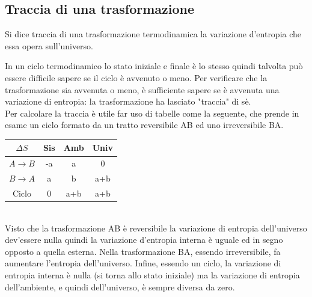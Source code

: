 \documentclass[
10pt, %
a4paper, %
oneside, %
headinclude,footinclude, %
BCOR5mm, %
]{scrartcl}
\begin{document}
\subsection{Traccia di una trasformazione}
\begin{definition}
	Si dice traccia di una trasformazione termodinamica la variazione d'entropia che essa opera sull'universo.
\end{definition}
In un ciclo termodinamico lo stato iniziale e finale è lo stesso quindi talvolta può essere difficile sapere se il ciclo è avvenuto o meno. Per verificare che la trasformazione sia avvenuta o meno, è sufficiente sapere se è avvenuta una variazione di entropia: la trasformazione ha lasciato "traccia" di sè.\\
Per calcolare la traccia è utile far uso di tabelle come la seguente, che prende in esame un ciclo formato da un tratto reversibile AB ed uno irreversibile BA. 
\begin{table}[h!]
	\begin{center}
		\begin{tabular}{ || c| c | c| c|| }
			\hline
			\(\Delta S\) & Sis& Amb& Univ\\
			\hline
			\(A\rightarrow B\)& -a   &a  &0  \\
			\(B\rightarrow A\)& a    &b   &a+b\\
			\hline
			Ciclo         & 0    &a+b &a+b \\
			\hline
		\end{tabular}
	\end{center}
\end{table}\\
Visto che la trasformazione AB è reversibile la variazione di entropia dell'universo dev'essere nulla quindi la variazione d'entropia interna è uguale ed in segno opposto a quella esterna. Nella trasformazione BA, essendo irreversibile, fa aumentare l'entropia dell'universo. Infine, essendo un ciclo, la variazione di entropia interna è nulla (si torna allo stato iniziale) ma la variazione di entropia dell'ambiente, e quindi dell'universo, è sempre diversa da zero. 
\end{document}
